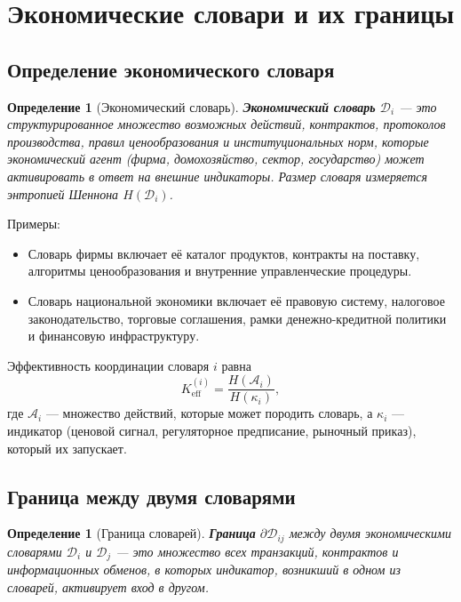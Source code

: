 \documentclass[12pt,a4paper]{article}
\newtheorem{definition}[theorem]{Определение}
\theoremstyle{remark}
\begin{document}
	\section{Экономические словари и их границы}
	
	\subsection{Определение экономического словаря}
	
	\begin{definition}[Экономический словарь]
		\textbf{Экономический словарь} \(\mathcal{D}_i\) — это структурированное множество возможных действий, контрактов, протоколов производства, правил ценообразования и институциональных норм, которые экономический агент (фирма, домохозяйство, сектор, государство) может активировать в ответ на внешние индикаторы. Размер словаря измеряется энтропией Шеннона \(H(\mathcal{D}_i)\).
	\end{definition}
	
	Примеры:
	\begin{itemize}
		\item Словарь фирмы включает её каталог продуктов, контракты на поставку, алгоритмы ценообразования и внутренние управленческие процедуры.
		\item Словарь национальной экономики включает её правовую систему, налоговое законодательство, торговые соглашения, рамки денежно-кредитной политики и финансовую инфраструктуру.
	\end{itemize}
	
	Эффективность координации словаря \(i\) равна
	\begin{equation}
		K_{\mathrm{eff}}^{(i)} = \frac{H(\mathcal{A}_i)}{H(\kappa_i)},
		\label{eq:keff_econ}
	\end{equation}
	где \(\mathcal{A}_i\) — множество действий, которые может породить словарь, а \(\kappa_i\) — индикатор (ценовой сигнал, регуляторное предписание, рыночный приказ), который их запускает.
	
	\subsection{Граница между двумя словарями}
	
	\begin{definition}[Граница словарей]
		\textbf{Граница} \(\partial\mathcal{D}_{ij}\) между двумя экономическими словарями \(\mathcal{D}_i\) и \(\mathcal{D}_j\) — это множество всех транзакций, контрактов и информационных обменов, в которых индикатор, возникший в одном из словарей, активирует вход в другом.
	\end{definition}
	
\end{document}

